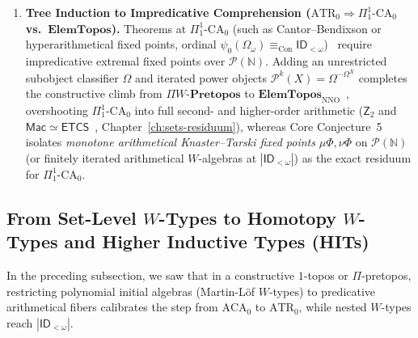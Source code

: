\documentclass[10pt,twoside,openright]{book}
\theoremstyle{crmplain}
\theoremstyle{crmdef}
\theoremstyle{crmremark}
\begin{document}
\begin{enumerate}[label=\textbf{\arabic*.},leftmargin=1.8em]
\[
  \begin{aligned}
    \mathrm{ACA}_0 + \bigl(\text{Arithmetical-Fiber Initial } &W\text{-Algebras for } P_f\bigr) \\
    &\iff \mathrm{ATR}_0 \quad (\text{Core Conj.~5}).
  \end{aligned}
\]

Extending a constructive $\Pi$-pretopos by unrestricted nested $W$-types ascends to $|\mathsf{ID}_{<\omega}|$ (surpassing $|\mathsf{CZF}| = |\mathsf{KP}\omega|$) without impredicative power sets.

  \item \textbf{Tree Induction to Impredicative Comprehension ($\mathrm{ATR}_0 \Rightarrow \Pi^1_1\text{-}\mathrm{CA}_0$ vs.\ $\mathbf{ElemTopos}$).} Theorems at $\Pi^1_1\text{-}\mathrm{CA}_0$ (such as Cantor--Bendixson or hyperarithmetical fixed points, ordinal $\psi_0(\Omega_\omega) \equiv_{\mathrm{Con}} \mathsf{ID}_{<\omega}$)~\cite{Friedman75,Simpson09} require impredicative extremal fixed points over $\mathcal{P}(\mathbb{N})$. Adding an unrestricted subobject classifier $\Omega$ and iterated power objects $\mathcal{P}^k(X) = \Omega^{\cdots\Omega^X}$ completes the constructive climb from $\Pi W\text{-}\mathbf{Pretopos}$ to $\mathbf{ElemTopos}_{\mathrm{NNO}}$~\cite{Maietti05}, overshooting $\Pi^1_1\text{-}\mathrm{CA}_0$ into full second- and higher-order arithmetic ($\mathsf{Z}_2$ and $\mathsf{Mac} \simeq \mathsf{ETCS}$~\cite{Cole73}, Chapter~\ref{ch:sets-residuum}), whereas Core Conjecture~5 isolates \emph{monotone arithmetical Knaster--Tarski fixed points} $\mu\Phi, \nu\Phi$ on $\mathcal{P}(\mathbb{N})$ (or finitely iterated arithmetical $W$-algebras at $|\mathsf{ID}_{<\omega}|$) as the exact residuum for $\Pi^1_1\text{-}\mathrm{CA}_0$.

\end{enumerate}

\subsection{\texorpdfstring{From Set-Level $W$-Types to Homotopy $W$-Types and Higher Inductive Types (HITs)}{From Set-Level W-Types to Homotopy W-Types and Higher Inductive Types (HITs)}}

In the preceding subsection, we saw that in a constructive $1$-topos or $\Pi$-pretopos, restricting polynomial initial algebras (Martin-L\"of $W$-types) to predicative arithmetical fibers calibrates the step from $\mathrm{ACA}_0$ to $\mathrm{ATR}_0$, while nested $W$-types reach $|\mathsf{ID}_{<\omega}|$.
\end{document}
